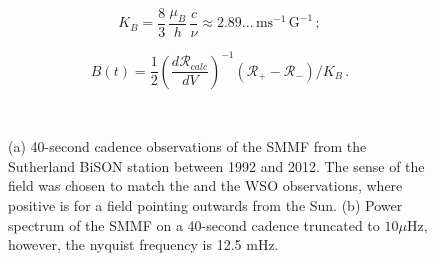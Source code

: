 \begin{equation}
K_B = \frac{8}{3} \, \frac{\mu_B}{h} \, \frac{c}{\nu} \approx 2.89... \, \mathrm{ms}^{-1} \, \mathrm{G}^{-1} \, ;
\label{eq:K_B}
\end{equation}

\begin{equation}
B(t) = \frac{1}{2} \left( \frac{d\mathcal{R}_{calc}}{dV} \right)^{-1} (\mathcal{R}_{+} - \mathcal{R}_{-}) / K_B \, .
\label{eq:simplified_SMMF_cal}
\end{equation}

\begin{figure}[ht!]
	\centering
	 \\ 
	\centering
	\caption{(a) 40-second cadence observations of the SMMF from the Sutherland BiSON station between 1992 and 2012. The sense of the field was chosen to match the \citet{chaplin_studies_2003} and the WSO observations, where positive is for a field pointing outwards from the Sun. (b) Power spectrum of the SMMF on a 40-second cadence truncated to $10 \mu\mathrm{Hz}$, however, the nyquist frequency is 12.5 mHz.}  
	\label{fig:BiSON_SMMF}
\end{figure}

